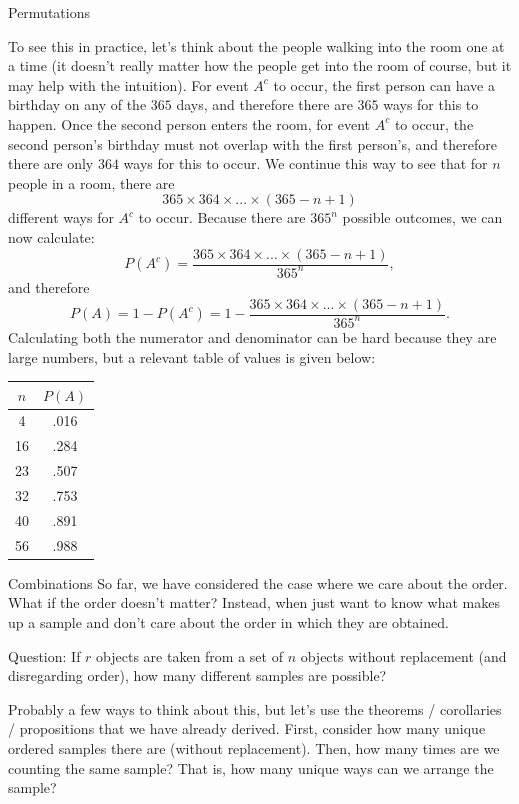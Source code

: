\begin{frame}[allowframebreaks]{Permutations}
{    To see this in practice, let's think about the people walking into the room one at a time (it doesn't really matter how the people get into the room of course, but it may help with the intuition).
    For event $A^c$ to occur, the first person can have a birthday on any of the $365$ days, and therefore there are $365$ ways for this to happen.
    Once the second person enters the room, for event $A^c$ to occur, the second person's birthday must not overlap with the first person's, and therefore there are only $364$ ways for this to occur. We continue this way to see that for $n$ people in a room, there are
    $$
    365 \times 364 \times ... \times (365 - n + 1)
    $$
    different ways for $A^c$ to occur.
    Because there are $365^n$ possible outcomes, we can now calculate:
    $$
    P(A^c) = \frac{365 \times 364 \times ... \times (365 - n + 1)}{365^n},
    $$
    and therefore
    $$
    P(A) = 1 - P(A^c) = 1 - \frac{365 \times 364 \times ... \times (365 - n + 1)}{365^n}.
    $$
    Calculating both the numerator and denominator can be hard because they are large numbers, but a relevant table of values is given below: 
    \begin{table}
    \centering
    \begin{tabular}{cc}
      $n$ & $P(A)$ \\\hline
      4 & .016 \\
      16 & .284 \\
      23 & .507 \\
      32 & .753 \\
      40 & .891 \\
      56 & .988 \\\hline
    \end{tabular}
    \end{table}
  }
  
\end{frame}

\begin{frame}{Combinations}
  So far, we have considered the case where we care about the order. What if the order doesn't matter? Instead, when just want to know what makes up a sample and don't care about the order in which they are obtained. 
  
  \alert{Question}: If $r$ objects are taken from a set of $n$ objects without replacement (and disregarding order), how many different samples are possible?
  
  Probably a few ways to think about this, but let's use the theorems / corollaries / propositions that we have already derived.
  First, consider how many unique ordered samples there are (without replacement). Then, how many times are we counting the same sample? That is, how many unique ways can we arrange the sample?
  
\end{frame}

